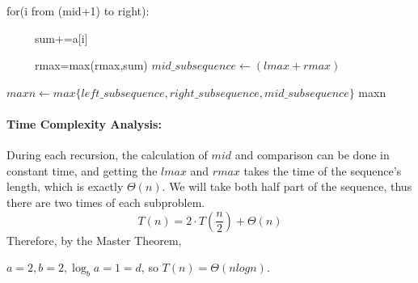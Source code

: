 \begin{solution}
\begin{algorithm}[H]
\begin{algorithmic}[1]
		for(i from (mid+1) to right):

		\ \ \ \ \ 	sum+=a[i]

		\ \ \ \ \ 	rmax=max(rmax,sum)
		\State $mid\_subsequence\gets (lmax+rmax)$

		\State $maxn\gets max\{left\_subsequence, right\_subsequence, mid\_subsequence\}$
		\State \Return maxn
		\EndFunction
	\end{algorithmic}
\end{algorithm}

\paragraph{Time Complexity Analysis:}
During each recursion, the calculation of $mid$ and comparison can be done in constant time, 
and getting the $lmax$ and $rmax$ takes the time of the sequence's length, which is exactly $\Theta(n)$. We will take both half part of the sequence, thus there are two times of each subproblem.
$$T(n) = 2\cdot T(\frac{n}{2})+\Theta(n)$$
Therefore, by the Master Theorem,

$a=2,b=2,\log_{b}{a}=1=d$, so $T(n) = \Theta(nlogn)$.
\end{solution}